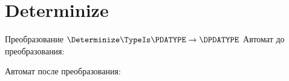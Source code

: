 \section{Determinize}
\begin{frame}{Преобразование $\Determinize\TypeIs\PDATYPE\to\DPDATYPE$}
	Автомат до преобразования:


	Автомат после преобразования:


\end{frame}

